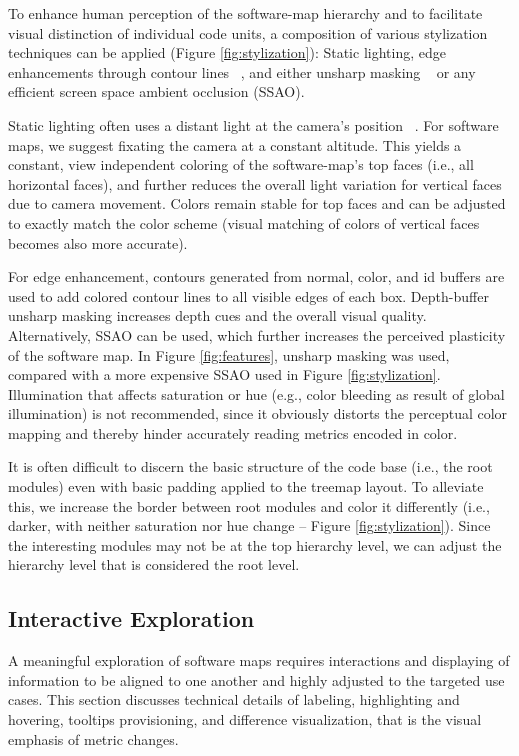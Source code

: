 \documentclass[annual]{acmsiggraph}
\newcommand{\scite}[1]{~\cite{#1}}
\begin{document}
To enhance human perception of the software-map hierarchy and to facilitate visual distinction of individual code units, a composition of various stylization techniques can be applied (Figure \ref{fig:stylization}):
Static lighting, edge enhancements through contour lines \scite{Nienhaus2003}, and either unsharp masking \scite{Luft2006} or any efficient screen space ambient occlusion (SSAO).

Static lighting often uses a distant light at the camera's position \scite{Trapp2013}. 
For software maps, we suggest fixating the camera at a constant altitude.
This yields a constant, view independent coloring of the software-map's top faces (i.e., all horizontal faces), and further reduces the overall light variation for vertical faces due to camera movement.
Colors remain stable for top faces and can be adjusted to exactly match the color scheme (visual matching of colors of vertical faces becomes also more accurate).

For edge enhancement, contours generated from normal, color, and id buffers are used to add colored contour lines to all visible edges of each box.
Depth-buffer unsharp masking increases depth cues and the overall visual quality.
Alternatively, SSAO can be used, which further increases the perceived plasticity of the software map.
In Figure \ref{fig:features}, unsharp masking was used, compared with a more expensive SSAO used in Figure \ref{fig:stylization}.
Illumination that affects saturation or hue (e.g., color bleeding as result of global illumination) is not recommended, since it obviously distorts the perceptual color mapping and thereby hinder accurately reading metrics encoded in color.

It is often difficult to discern the basic structure of the code base (i.e., the root modules) even with basic padding applied to the treemap layout.
To alleviate this, we increase the border between root modules and color it differently (i.e., darker, with neither saturation nor hue change -- Figure \ref{fig:stylization}).
Since the interesting modules may not be at the top hierarchy level, we can adjust the hierarchy level that is considered the root level.

\subsection{Interactive Exploration}

A meaningful exploration of software maps requires interactions and displaying of information to be aligned to one another and highly adjusted to the targeted use cases.
This section discusses technical details of labeling, highlighting and hovering, tooltips provisioning, and difference visualization, that is the visual emphasis of metric changes.
\end{document}
